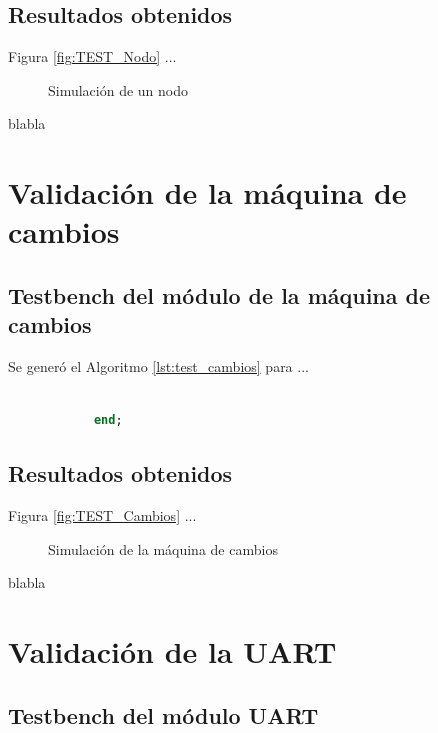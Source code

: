 		\subsection{Resultados obtenidos}
			
			Figura \ref{fig:TEST_Nodo} ...
			
			\begin{figure}[h]
			\centering
				\caption{Simulación de un nodo}
				\label{fig:Test_Nodo}
			\end{figure}
				
			blabla
			
	
\section{Validación de la máquina de cambios}

	\subsection{Testbench del módulo de la máquina de cambios}
			
		Se generó el Algoritmo \ref{lst:test_cambios} para ...
			
		\begin{lstlisting}[language = vhdl,caption=Testbench del módulo de la máquina de cambios,label={lst:test_cambios}] 
				
			end;
		\end{lstlisting}
			
	\subsection{Resultados obtenidos}
			
		Figura \ref{fig:TEST_Cambios} ...
		
		\begin{figure}[h]
		\centering
			\caption{Simulación de la máquina de cambios}
			\label{fig:Test_Cambios}
		\end{figure}
			
		blabla
			
\section{Validación de la UART}

	\subsection{Testbench del módulo UART}
			
